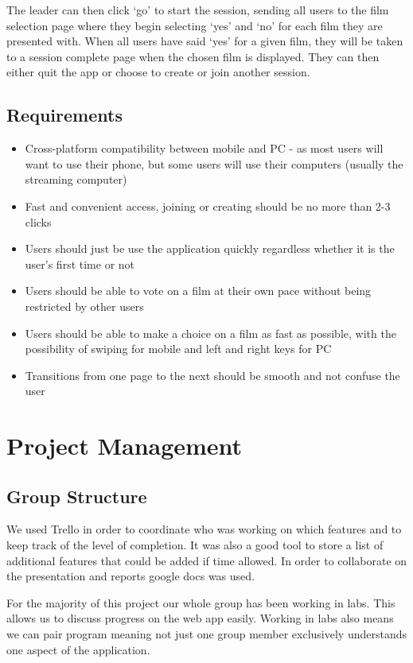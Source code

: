 \documentclass{article}
\begin{document}
The leader can then click ‘go’ to start the session, sending all users to the film selection page where they begin selecting ‘yes’ and ‘no’ for each film they are presented with. When all users have said ‘yes’ for a given film, they will be taken to a session complete page when the chosen film is displayed. They can then either quit the app or choose to create or join another session.

\subsection{Requirements}
\begin{itemize}
\item Cross-platform compatibility between mobile and PC - as most users will want to use their phone, but some users will use their computers (usually the streaming computer)
\item Fast and convenient access, joining or creating should be no more than 2-3 clicks
\item Users should just be use the application quickly regardless whether it is the user’s first time or not
\item Users should be able to vote on a film at their own pace without being restricted by other users
\item Users should be able to make a choice on a film as fast as possible, with the possibility of swiping for mobile and left and right keys for PC
\item Transitions from one page to the next should be smooth and not confuse the user
\end{itemize}
\section{Project Management}
\subsection{Group Structure}
We used Trello in order to coordinate who was working on which features and to keep track of the level of completion. It was also a good tool to store a list of additional features that could be added if time allowed. In order to collaborate on the presentation and reports google docs was used. 

For the majority of this project our whole group has been working in labs. This allows us to discuss progress on the web app easily. Working in labs also means we can pair program meaning not just one group member exclusively understands one aspect of the application. 
\end{document}
